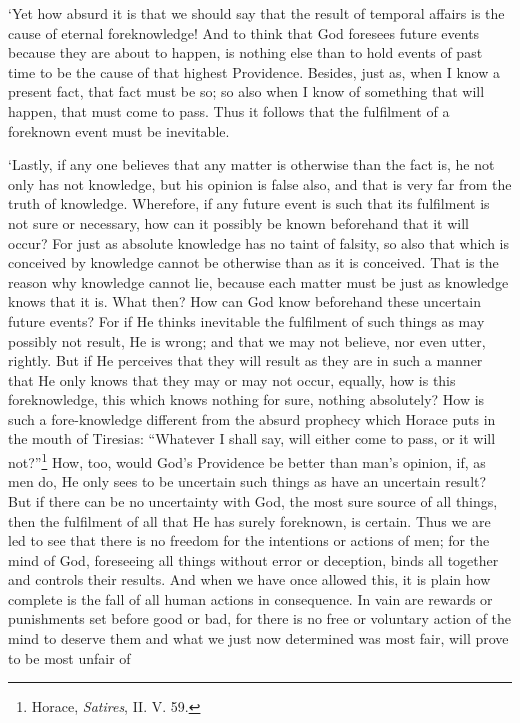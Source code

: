 `Yet how absurd it is that we should say that the result of temporal
affairs is the cause of eternal foreknowledge! And to think that God
foresees future events because they are about to happen, is nothing
else than to hold events of past time to be the cause of that highest
Providence. Besides, just as, when I know a present fact, that fact
must be so; so also when I know of something that will happen, that
must come to pass. Thus it follows that the fulfilment of a foreknown
event must be inevitable.

`Lastly, if any one believes that any matter is otherwise than the
fact is, he not only has not knowledge, but his opinion is false also,
and that is very far from the truth of knowledge. Wherefore, if any
future event is such that its fulfilment is not sure or necessary, how
can it possibly be known beforehand that it will occur? For just as
absolute knowledge has no taint of falsity, so also that which is
conceived by knowledge cannot be otherwise than as it is conceived.
That is the reason why knowledge cannot lie, because each matter must
be just as knowledge knows that it is. What then? How can God know
beforehand these uncertain future events? For if He thinks inevitable
the  fulfilment of such things as may possibly not result,
He is wrong; and that we may not believe, nor even utter, rightly. But
if He perceives that they will result as they are in such a manner
that He only knows that they may or may not occur, equally, how is
this foreknowledge, this which knows nothing for sure, nothing
absolutely? How is such a fore-knowledge different from the absurd
prophecy which Horace puts in the mouth of Tiresias: ``Whatever I
shall say, will either come to pass, or it will
not?''\footnote{Horace, \textit{Satires}, \textsc{II}. \textsc{V}.
59.} How, too, would God's Providence be better than man's opinion,
if, as men do, He only sees to be uncertain such things as have an
uncertain result? But if there can be no uncertainty with God, the
most sure source of all things, then the fulfilment of all that He has
surely foreknown, is certain. Thus we are led to see that there is no
freedom for the intentions or actions of men; for the mind of God,
foreseeing all things without error or deception, binds all together
and controls their results. And when we have once allowed this, it is
plain how complete is the fall of all human actions in consequence. In
vain are rewards or punishments set before good or bad, for there is
no free or voluntary action of the mind to deserve them and what we
just now determined was most fair, will prove to be most unfair of
